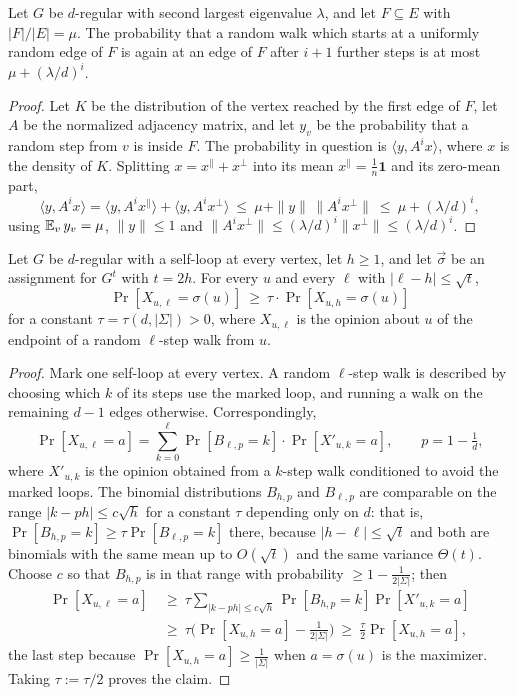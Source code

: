 \begin{proposition}\label{prop:walk-f}
Let $G$ be $d$-regular with second largest eigenvalue $\lambda$, and let $F\subseteq E$ with $|F|/|E|=\mu$.  The probability that a random walk which starts at a uniformly random edge of $F$ is again at an edge of $F$ after $i+1$ further steps is at most $\mu+(\lambda/d)^i$.
\end{proposition}
\begin{proof}
Let $K$ be the distribution of the vertex reached by the first edge of $F$, let $A$ be the normalized adjacency matrix, and let $y_v$ be the probability that a random step from $v$ is inside $F$.  The probability in question is $\langle y,A^ix\rangle$, where $x$ is the density of $K$.  Splitting $x=x^\parallel+x^\perp$ into its mean $x^\parallel=\frac1n\mathbf 1$ and its zero-mean part,
\[
  \langle y,A^ix\rangle=\langle y,A^ix^\parallel\rangle+\langle y,A^ix^\perp\rangle\ \le\ \mu+\|y\|\,\|A^ix^\perp\|\ \le\ \mu+(\lambda/d)^i,
\]
using $\operatorname*{\mathbb{E}}_vy_v=\mu$, $\|y\|\le1$ and $\|A^ix^\perp\|\le(\lambda/d)^i\|x^\perp\|\le(\lambda/d)^i$.
\end{proof}

\begin{lemma}\label{lem:binom}
Let $G$ be $d$-regular with a self-loop at every vertex, let $h\ge1$, and let $\vec\sigma$ be an assignment for $G^t$ with $t=2h$.  For every $u$ and every $\ell$ with $|\ell-h|\le\sqrt t$,
\[
  \Pr[X_{u,\ell}=\sigma(u)]\ \ge\ \tau\cdot\Pr[X_{u,h}=\sigma(u)]
\]
for a constant $\tau=\tau(d,|\Sigma|)>0$, where $X_{u,\ell}$ is the opinion about $u$ of the endpoint of a random $\ell$-step walk from $u$.
\end{lemma}
\begin{proof}
Mark one self-loop at every vertex.  A random $\ell$-step walk is described by choosing which $k$ of its steps use the marked loop, and running a walk on the remaining $d-1$ edges otherwise.  Correspondingly,
\[
  \Pr[X_{u,\ell}=a]=\sum_{k=0}^{\ell}\Pr[B_{\ell,p}=k]\cdot\Pr[X'_{u,k}=a],\qquad p=1-\tfrac1d,
\]
where $X'_{u,k}$ is the opinion obtained from a $k$-step walk conditioned to avoid the marked loops.  The binomial distributions $B_{h,p}$ and $B_{\ell,p}$ are comparable on the range $|k-ph|\le c\sqrt h$ for a constant $\tau$ depending only on $d$: that is, $\Pr[B_{h,p}=k]\ge\tau\Pr[B_{\ell,p}=k]$ there, because $|h-\ell|\le\sqrt t$ and both are binomials with the same mean up to $O(\sqrt t)$ and the same variance $\Theta(t)$.
Choose $c$ so that $B_{h,p}$ is in that range with probability $\ge1-\frac1{2|\Sigma|}$; then
\begin{align*}
  \Pr[X_{u,\ell}=a]\ &\ge\ \tau\!\!\sum_{|k-ph|\le c\sqrt h}\!\!\Pr[B_{h,p}=k]\Pr[X'_{u,k}=a]\\
  &\ge\ \tau\Big(\Pr[X_{u,h}=a]-\frac1{2|\Sigma|}\Big)\ \ge\ \frac\tau2\Pr[X_{u,h}=a],
\end{align*}
the last step because $\Pr[X_{u,h}=a]\ge\frac1{|\Sigma|}$ when $a=\sigma(u)$ is the maximizer.  Taking $\tau:=\tau/2$ proves the claim.
\end{proof}

